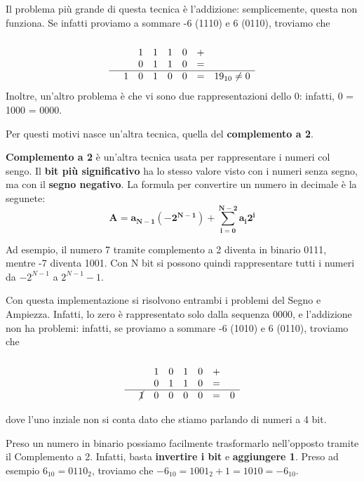 \documentclass[11pt, a4paper, titlepage, oneside]{scrbook}
\begin{document}
Il problema più grande di questa tecnica è l'addizione: semplicemente, questa non funziona. Se infatti proviamo a sommare -6 (1110) e 6 (0110), troviamo che
\[
\begin{array}{rccccccc}
& & & & & & \\
& & 1 & 1 & 1 & 0 & + &\\
& & 0 & 1 & 1 & 0 & = &\\
\hline
& 1 & 0 & 1 & 0 & 0& = & 19_{10} \neq 0
\end{array}
\]
Inoltre, un'altro problema è che vi sono due rappresentazioni dello 0: infatti, 0 = 1000 = 0000. 

Per questi motivi nasce un'altra tecnica, quella del \textbf{complemento a 2}.

\begin{Proprieta}[Complemento a 2]
\label{prop-complemento a 2}
\textbf{Complemento a 2} è un'altra tecnica usata per rappresentare i numeri col sengo. Il \textbf{bit più significativo} ha lo stesso valore visto con i numeri senza segno, ma con il \textbf{segno negativo}. La formula per convertire un numero in decimale è la segunete:
\[
\bm{A = a_{N-1}(-2^{N-1}) + \sum_{i = 0}^{N-2} a_i2^i}
\]
\end{Proprieta}

Ad esempio, il numero 7 tramite complemento a 2 diventa in binario 0111, mentre -7 diventa 1001. Con N bit si possono quindi rappresentare tutti i numeri da $-2^{N-1}$ a $2^{N-1} - 1$. 

Con questa implementazione si risolvono entrambi i problemi del Segno e Ampiezza. Infatti, lo zero è rappresentato solo dalla sequenza 0000, e l'addizione non ha problemi: infatti, se proviamo a sommare -6 (1010) e 6 (0110), troviamo che
\[
\begin{array}{rccccccc}
& & & & & & \\
& & 1 & 0 & 1 & 0 & + &\\
& & 0 & 1 & 1 & 0 & = &\\
\hline
& \cancel{1} & 0 & 0 & 0 & 0& = & 0
\end{array}
\]

dove l'uno inziale non si conta dato che stiamo parlando di numeri a 4 bit.

\begin{Proprieta}
\label{prop-trasformare-complemento-2}
Preso un numero in binario possiamo facilmente trasformarlo nell'opposto tramite il Complemento a 2. Infatti, basta \textbf{invertire i bit} e \textbf{aggiungere 1}. Preso ad esempio $6_{10} = 0110_{2}$, troviamo che $-6_{10} = 1001_2 + 1 = 1010 = -6_{10}$.
\end{Proprieta}
\end{document}
